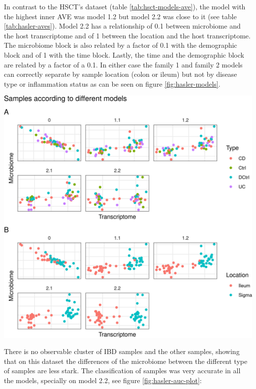 \documentclass[
  a4paper,
]{book}
\let\origfigure\figure
\let\endorigfigure\endfigure
\renewenvironment{figure}[1][2] {
    \expandafter\origfigure\expandafter[!ht]
} {
    \endorigfigure
}
\begin{document}
In contrast to the HSCT's dataset (table \ref{tab:hsct-models-ave}), the model with the highest inner AVE was model 1.2 but model 2.2 was close to it (see table \ref{tab:hasler-aves}).
Model 2.2 has a relationship of 0.1 between microbiome and the host transcriptome and of 1 between the location and the host transcriptome.
The microbiome block is also related by a factor of 0.1 with the demographic block and of 1 with the time block.
Lastly, the time and the demographic block are related by a factor of a 0.1.
In either case the family 1 and family 2 models can correctly separate by sample location (colon or ileum) but not by disease type or inflammation status as can be seen on figure \ref{fig:hasler-models}.

\begin{figure}
\centering
\includegraphics{images/hasler-models.png}
\caption{\label{fig:hasler-models} Models on the Häsler's dataset. Model 0 with just the transcriptome and microbiome data. Models 1.1 to 1.2 with transcriptome, microbiome and sample data in a single block. Models 2.1 and 2.2 with transcriptome, microbiome and sample data in multiple blocks. On the A panel colored by disease on the B panel colored by location of the sample.}
\end{figure}

There is no observable cluster of IBD samples and the other samples, showing that on this dataset the differences of the microbiome between the different type of samples are less stark.
The classification of samples was very accurate in all the models, specially on model 2.2, see figure \ref{fig:hasler-auc-plot}:
\end{document}

